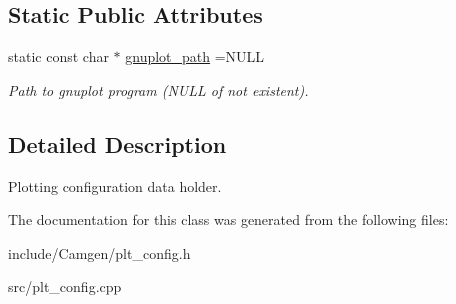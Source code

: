\subsection*{Static Public Attributes}
\begin{DoxyCompactItemize}
\item 
\hypertarget{a00422_ad397bbb1415a8958506aab635f26ed60}{static const char $\ast$ \hyperlink{a00422_ad397bbb1415a8958506aab635f26ed60}{gnuplot\-\_\-path} =N\-U\-L\-L}\label{a00422_ad397bbb1415a8958506aab635f26ed60}

\begin{DoxyCompactList}\small\item\em Path to gnuplot program (N\-U\-L\-L of not existent). \end{DoxyCompactList}\end{DoxyCompactItemize}


\subsection{Detailed Description}
Plotting configuration data holder. 

The documentation for this class was generated from the following files\-:\begin{DoxyCompactItemize}
\item 
include/\-Camgen/plt\-\_\-config.\-h\item 
src/plt\-\_\-config.\-cpp\end{DoxyCompactItemize}
